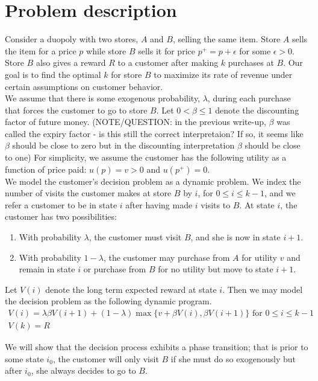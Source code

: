 \documentclass{article}
\begin{document}
\section{Problem description}
Consider a duopoly with two stores, $A$ and $B$, selling the same item. Store $A$ sells the item for a price $p$ while store $B$ sells it for price $p^{+} = p+\epsilon$ for some $\epsilon > 0$. Store $B$ also gives a reward $R$ to a customer after making $k$ purchases at $B$. Our goal is to find the optimal $k$ for store $B$ to maximize its rate of revenue under certain assumptions on customer behavior. \\

We assume that there is some exogenous probability, $\lambda$, during each purchase that forces the customer to go to store $B$. Let $0 < \beta \leq 1$ denote the discounting factor of future money. (NOTE/QUESTION: in the previous write-up, $\beta$ was called the expiry factor - is this still the correct interpretaion? If so, it seems like $\beta$ should be close to zero but in the discounting interpretation $\beta$ should be close to one) For simplicity, we assume the customer has the following utility as a function of price paid: $u(p) = v > 0$ and $u(p^+) = 0$. \\

We model the customer's decision problem as a dynamic problem. We index the number of visits the customer makes at store $B$ by $i$, for $0 \leq i \leq k-1$, and we refer a customer to be in state $i$ after having made $i$ visits to $B$. At state $i$, the customer has two possibilities:
\begin{enumerate}
\item
With probability $\lambda$, the customer must visit $B$, and she is now in state $i+1$.
\item
With probability $1-\lambda$, the customer may purchase from $A$ for utility $v$ and remain in state $i$ or purchase from $B$ for no utility but move to state $i+1$.
\end{enumerate}

Let $V(i)$ denote the long term expected reward at state $i$. Then we may model the decision problem as the following dynamic program.
\begin{gather*}
V(i) = \lambda \beta V(i+1) + (1-\lambda)\max\{v+\beta V(i),\beta V(i+1) \} \mbox{ for } 0\leq i \leq k-1 \\
V(k) = R
\end{gather*}

We will show that the decision process exhibits a phase transition; that is prior to some state $i_0$, the customer will only visit $B$ if she must do so exogenously but after $i_0$, she always decides to go to $B$. \\
\end{document}
